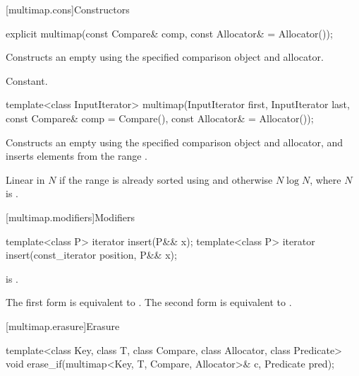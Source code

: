 [multimap.cons]{Constructors}

%
\begin{itemdecl}
explicit multimap(const Compare& comp, const Allocator& = Allocator());
\end{itemdecl}

\begin{itemdescr}
\pnum
\effects
Constructs an empty
using the specified comparison object and allocator.

\pnum
\complexity
Constant.
\end{itemdescr}

%
\begin{itemdecl}
template<class InputIterator>
  multimap(InputIterator first, InputIterator last,
           const Compare& comp = Compare(),
           const Allocator& = Allocator());
\end{itemdecl}

\begin{itemdescr}
\pnum
\effects
Constructs an empty
using the specified comparison object and allocator,
and inserts elements from the range
.

\pnum
\complexity
Linear in $N$ if the range
is already sorted using 
and otherwise $N \log N$,
where $N$ is
.
\end{itemdescr}

[multimap.modifiers]{Modifiers}

%
\begin{itemdecl}
template<class P> iterator insert(P&& x);
template<class P> iterator insert(const_iterator position, P&& x);
\end{itemdecl}

\begin{itemdescr}
\pnum
\constraints
{} is .

\pnum
\effects
The first form is equivalent to
. The second form is
equivalent to .
\end{itemdescr}

[multimap.erasure]{Erasure}

%
\begin{itemdecl}
template<class Key, class T, class Compare, class Allocator, class Predicate>
  void erase_if(multimap<Key, T, Compare, Allocator>& c, Predicate pred);
\end{itemdecl}

